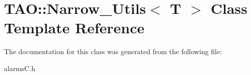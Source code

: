 \section{T\+AO\+:\+:Narrow\+\_\+\+Utils$<$ T $>$ Class Template Reference}
\label{classTAO_1_1Narrow__Utils}


The documentation for this class was generated from the following file\+:\begin{DoxyCompactItemize}
\item 
alarms\+C.\+h\end{DoxyCompactItemize}
